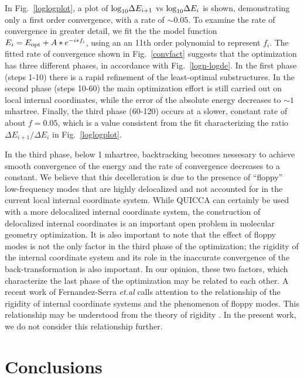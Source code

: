 \documentclass[prl,aps,preprint,showpacs,superbib]{revtex4}
\begin{document}
In Fig.~\ref{loglogplot}, a plot of ${\rm log}_{10}{\Delta E_{i+1}}$ vs ${\rm log }_{10} {\Delta E_{i}}$ 
is shown, demonstrating only a first order convergence, with a rate
of $\sim 0.05$.   To examine the rate of convergence
in greater detail, we fit the the model function $E_{i}=E_{\rm opt}+A*e^{-i * f_i}$, using an 
an 11th order polynomial to represent $f_i$.  The fitted rate of convergence shown in Fig.~\ref{convfact}
suggests that the optimization has three different phases, in accordance with Fig.~\ref{logn-logde}.
In the first phase (steps 1-10) there is a rapid refinement of the least-optimal substructures. In the 
second phase (steps 10-60) the main optimization effort is still carried out on local internal coordinates, 
while the error of the absolute energy decreases to $\sim 1$ mhartree.  Finally, the third phase (60-120) 
occurs at a slower, constant rate of about $f=0.05$, which is a value 
consistent from the fit characterizing the ratio ${\Delta E_{i+1}}/{\Delta E_{i}}$ in Fig.~\ref{loglogplot}.

In the third phase, below 1 mhartree, backtracking becomes nessesary to achieve smooth 
convergence of the energy and the rate of convergence decreases to a constant.  We believe
that this decelleration is due to the presence of ``floppy'' low-frequency modes
that are highly delocalized and not accounted for in the current local internal 
coordinate system.  While QUICCA can certainly be used with a more delocalized 
internal coordinate system, the construction of delocalized internal coordinates 
is an important open problem in molecular geometry optimization.   It is also important to note that 
the effect of floppy modes is not the only factor in the third phase of the optimization; the rigidity 
of the internal coordinate system and its role in the inaccurate convergence of the back-transformation 
is also important. In our opinion, these two factors, which characterize the last phase of the 
optimization may be related to each other.  A recent work of Fernandez-Serra {\it et.al} \cite{Serra03} 
calls attention to the relationship of the rigidity of internal coordinate systems and the 
phenomenon of floppy modes. This relationship may be understood from the theory of 
rigidity \cite{Phillips85}. In the present work, we do not 
consider this relationship further.

\section{Conclusions}
\end{document}
